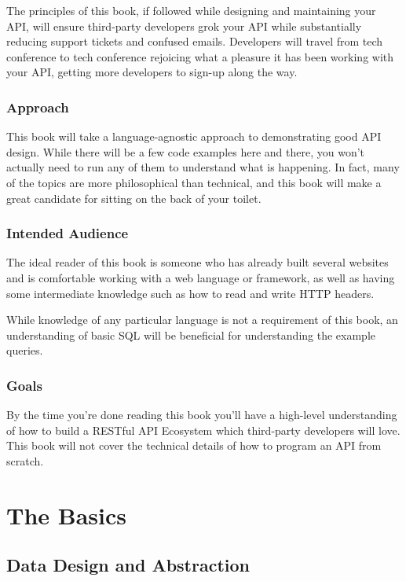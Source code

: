 \documentclass{book}
\begin{document}
The principles of this book, if followed while designing and maintaining your API, will ensure third-party developers grok your API while substantially reducing support tickets and confused emails. Developers will travel from tech conference to tech conference rejoicing what a pleasure it has been working with your API, getting more developers to sign-up along the way.

\subsection*{Approach}

This book will take a language-agnostic approach to demonstrating good API design. While there will be a few code examples here and there, you won't actually need to run any of them to understand what is happening. In fact, many of the topics are more philosophical than technical, and this book will make a great candidate for sitting on the back of your toilet.

\subsection*{Intended Audience}

The ideal reader of this book is someone who has already built several websites and is comfortable working with a web language or framework, as well as having some intermediate knowledge such as how to read and write HTTP headers.

While knowledge of any particular language is not a requirement of this book, an understanding of basic SQL will be beneficial for understanding the example queries.

\subsection*{Goals}

By the time you're done reading this book you'll have a high-level understanding of how to build a RESTful API Ecosystem which third-party developers will love. This book will not cover the technical details of how to program an API from scratch.


\chapter{The Basics}

\section{Data Design and Abstraction}
\end{document}
